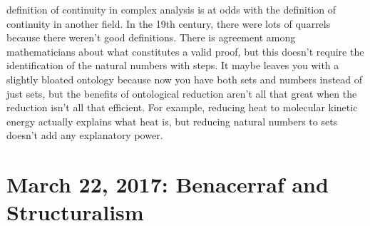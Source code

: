 \documentclass[12pt]{article}
\theoremstyle{definition}
\begin{document}
\begin{itemize}
        definition of continuity in complex analysis is at odds with the
        definition of continuity in another field. In the 19th century, there
        were lots of quarrels because there weren't good definitions. There is
        agreement among mathematicians about what constitutes a valid proof,
        but this doesn't require the identification of the natural numbers with
        steps. It maybe leaves you with a slightly bloated ontology because now
        you have both sets and numbers instead of just sets, but the benefits
        of ontological reduction aren't all that great when the reduction isn't
        all that efficient. For example, reducing heat to molecular kinetic
        energy actually explains what heat is, but reducing natural numbers to
        sets doesn't add any explanatory power. 

\end{itemize}

\section{March 22, 2017: Benacerraf and Structuralism}
\end{document}
